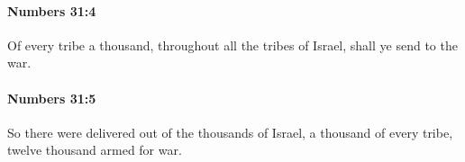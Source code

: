 		\paragraph{Numbers 31:4} %
			\label{NUMBERS-31-4}

			Of every tribe a thousand, throughout all the tribes of Israel, shall ye send to the war.


		\paragraph{Numbers 31:5} %
			\label{NUMBERS-31-5}

			So there were delivered out of the thousands of Israel, a thousand of every tribe, twelve thousand armed for war.


